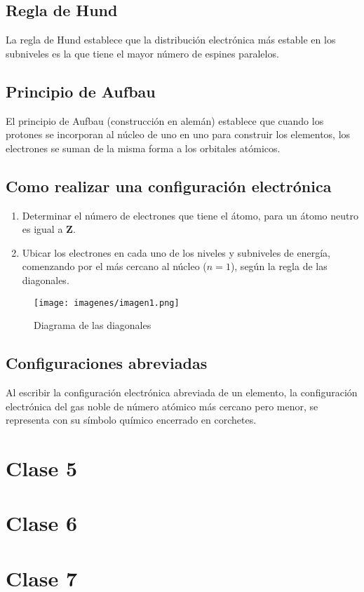 \documentclass{article}
\begin{document}
\subsection{Regla de Hund}
La regla de Hund establece que la distribución electrónica más estable en los subniveles es la que tiene el mayor número de espines paralelos.

\subsection{Principio de Aufbau}
El principio de Aufbau (construcción en alemán) establece que cuando los protones se incorporan al núcleo de uno en uno para construir los elementos, los electrones se suman de la misma  forma a los orbitales atómicos.

\subsection{Como realizar una configuración electrónica}
\begin{enumerate}
    \item Determinar el número de electrones que tiene el átomo, para un átomo neutro es igual a \textbf{Z}.
    
    \item Ubicar los electrones en cada uno de los niveles y subniveles de energía, comenzando por el más cercano al núcleo ($n=1$), según la regla de las diagonales.
\end{enumerate}

\begin{figure}[h]
\caption{Diagrama de las diagonales}
\centering
\texttt{[image: imagenes/imagen1.png]}
\end{figure}


\subsection{Configuraciones abreviadas}
Al escribir la configuración electrónica abreviada de un elemento, la configuración electrónica del gas noble de número atómico más cercano pero menor, se representa con su símbolo químico encerrado en corchetes.

\section{Clase 5}

\section{Clase 6}

\section{Clase 7}
\end{document}
